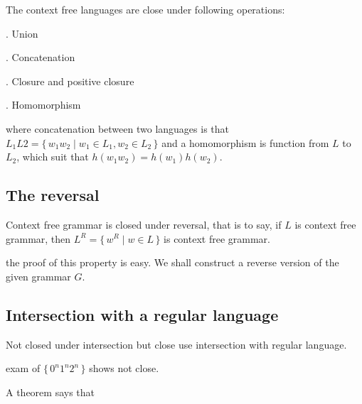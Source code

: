 \documentclass[../main]{subfiles}
\begin{document}
\begin{thm}
\label{The closure properties of context free language}
The context free languages are close under following operations: 

. Union

. Concatenation

. Closure and positive closure

. Homomorphism
\bigskip 

	where concatenation between two languages is that \(L_1 L 2 = \{ \, w_1 w_2 \mid w_1 \in L_1 , w_2 \in L_2 \,\}\) and a 
	homomorphism is function from \( L\) to \(L_2\), which suit that \( h ( w_1 w_2 ) = h (w_1) h(w_2)\).  
\end{thm}

\subsection{The reversal}
Context free grammar is closed under reversal, that is to say, if \(L\) is context free grammar, then
\( L ^{R} = \{\, w^{R} \mid w \in L \,\}\) is context free grammar.

\medskip 
the proof of this property is easy. We shall construct a reverse version of the given grammar \(G\).

\subsection{Intersection with a regular language}
Not closed under intersection but close use intersection with 
regular language.

exam of \(\{ \, 0 ^{n} 1 ^{n} 2 ^{n} \,\}\) shows not close.

A theorem says that 
\end{document}
